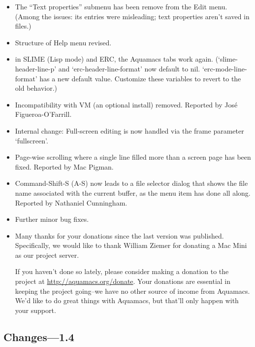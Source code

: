 \begin{itemize}
\item The ``Text properties'' submenu has been remove from the Edit menu.  (Among the issues: its entries were misleading; text properties aren't saved in files.)

\item Structure of Help menu revised.

\item in SLIME (Lisp mode) and ERC, the Aquamacs tabs work again. (`slime-header-line-p' and `erc-header-line-format' now default to nil. `erc-mode-line-format' has a new default value. Customize these variables to revert to the old behavior.)

\item Incompatibility with VM (an optional install)  removed.
Reported by José Figueroa-O'Farrill.

\item Internal change: Full-screen editing is now handled via the
  frame parameter `fullscreen'.

\item Page-wise scrolling where a single line filled more than a screen page has been fixed.
Reported by Mac Pigman.

\item Command-Shift-S (A-S) now leads to a file selector dialog that shows the file name associated with the current buffer, as the menu item has done all along.
Reported by Nathaniel Cunningham.

\item Further minor bug fixes.

\item Many thanks for your donations since the last version was published.  Specifically, we would like to thank William Ziemer for donating a Mac Mini as our project server.  

If you haven't done so lately, please consider making a donation to the project at \url{http://aquamacs.org/donate}. Your donations are essential in keeping the project going--we have no other source of income from Aquamacs.  We'd like to do great things with Aquamacs, but that'll only happen with your support. 



\end{itemize}

\subsection{Changes---1.4}


